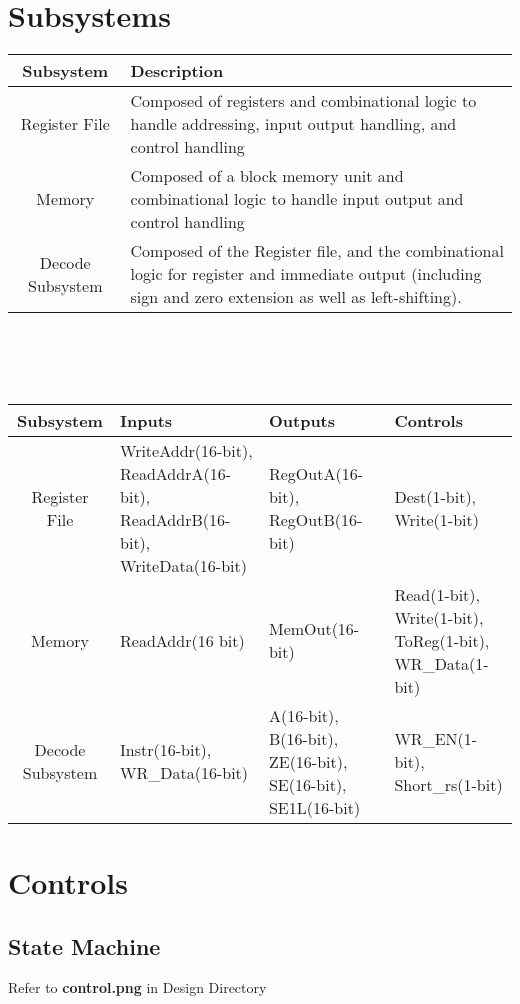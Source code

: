 \documentclass[12pt, a4paper]{report}
\begin{document}
	\section{Subsystems}
	\begin{minipage}[c]{\textwidth}
		{\renewcommand{\arraystretch}{1.5}
			\begin{tabular}[t]{c|p{11cm}}
				Subsystem & Description \\
				\hline
				Register File & Composed of registers and combinational logic to handle addressing, input output handling, and control
				handling  \\
				Memory & Composed of a block memory unit and combinational logic to handle input output and control handling \\
				Decode Subsystem & Composed of the Register file, and the combinational logic for register and immediate output
				(including sign and zero extension as well as left-shifting). 
			\end{tabular}
		}\\\\\\
		{\renewcommand{\arraystretch}{1.5}
			\begin{tabular}[t]{c|p{4cm}|p{4cm}| p{3cm}}
				Subsystem & Inputs & Outputs & Controls \\
				\hline
				Register File & WriteAddr(16-bit), ReadAddrA(16-bit), ReadAddrB(16-bit), WriteData(16-bit) & RegOutA(16-bit), RegOutB(16-bit) & Dest(1-bit), Write(1-bit) \\
				\hline
				Memory & ReadAddr(16 bit) & MemOut(16-bit) & Read(1-bit), Write(1-bit), ToReg(1-bit), WR\_Data(1-bit) \\
				\hline
				Decode Subsystem & Instr(16-bit), WR\_Data(16-bit) & A(16-bit), B(16-bit), ZE(16-bit), SE(16-bit), SE1L(16-bit) & 
				WR\_EN(1-bit), Short\_rs(1-bit)
			\end{tabular}
		}
	\end{minipage}

	\section{Controls}
		\subsection{State Machine}
		Refer to \textbf{control.png} in Design Directory
		\pagebreak
\end{document}

